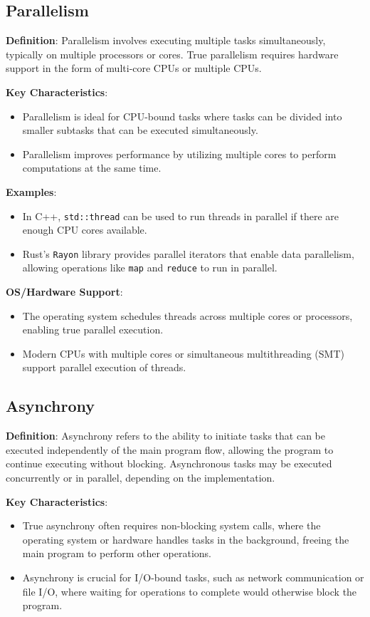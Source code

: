 \documentclass{article}
\begin{document}
\subsection*{Parallelism}
\textbf{Definition}: Parallelism involves executing multiple tasks simultaneously, typically on multiple processors or cores. True parallelism requires hardware support in the form of multi-core CPUs or multiple CPUs.

\textbf{Key Characteristics}:
\begin{itemize}
    \item Parallelism is ideal for CPU-bound tasks where tasks can be divided into smaller subtasks that can be executed simultaneously.
    \item Parallelism improves performance by utilizing multiple cores to perform computations at the same time.
\end{itemize}

\textbf{Examples}:
\begin{itemize}
    \item In C++, \texttt{std::thread} can be used to run threads in parallel if there are enough CPU cores available.
    \item Rust's \texttt{Rayon} library provides parallel iterators that enable data parallelism, allowing operations like \texttt{map} and \texttt{reduce} to run in parallel.
\end{itemize}

\textbf{OS/Hardware Support}:
\begin{itemize}
    \item The operating system schedules threads across multiple cores or processors, enabling true parallel execution.
    \item Modern CPUs with multiple cores or simultaneous multithreading (SMT) support parallel execution of threads.
\end{itemize}

\subsection*{Asynchrony}
\textbf{Definition}: Asynchrony refers to the ability to initiate tasks that can be executed independently of the main program flow, allowing the program to continue executing without blocking. Asynchronous tasks may be executed concurrently or in parallel, depending on the implementation.

\textbf{Key Characteristics}:
\begin{itemize}
    \item True asynchrony often requires non-blocking system calls, where the operating system or hardware handles tasks in the background, freeing the main program to perform other operations.
    \item Asynchrony is crucial for I/O-bound tasks, such as network communication or file I/O, where waiting for operations to complete would otherwise block the program.
\end{itemize}
\end{document}
